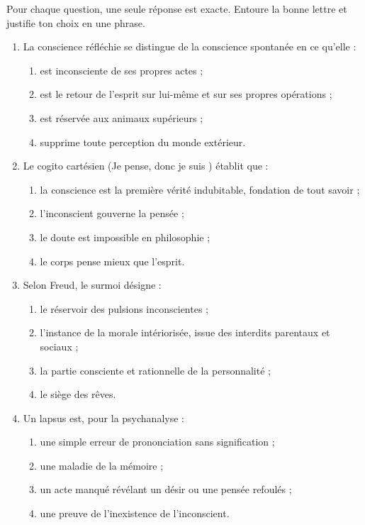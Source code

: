 \documentclass[11pt]{article}
\newcommand{\cle}[1]{{\popxbold\color{popdark}#1}}
\begin{document}
\begin{exercice}
Pour chaque question, une seule réponse est exacte. Entoure la bonne lettre et justifie ton choix en une phrase.

\begin{enumerate}
\item La conscience \cle{réfléchie} se distingue de la conscience spontanée en ce qu'elle :
\begin{enumerate}
\item[a)] est inconsciente de ses propres actes ;
\item[b)] est le retour de l'esprit sur lui-même et sur ses propres opérations ;
\item[c)] est réservée aux animaux supérieurs ;
\item[d)] supprime toute perception du monde extérieur.
\end{enumerate}
\item Le \cle{cogito} cartésien (\guillemotleft Je pense, donc je suis \guillemotright) établit que :
\begin{enumerate}
\item[a)] la conscience est la première vérité indubitable, fondation de tout savoir ;
\item[b)] l'inconscient gouverne la pensée ;
\item[c)] le doute est impossible en philosophie ;
\item[d)] le corps pense mieux que l'esprit.
\end{enumerate}
\item Selon Freud, le \cle{surmoi} désigne :
\begin{enumerate}
\item[a)] le réservoir des pulsions inconscientes ;
\item[b)] l'instance de la morale intériorisée, issue des interdits parentaux et sociaux ;
\item[c)] la partie consciente et rationnelle de la personnalité ;
\item[d)] le siège des rêves.
\end{enumerate}
\item Un \cle{lapsus} est, pour la psychanalyse :
\begin{enumerate}
\item[a)] une simple erreur de prononciation sans signification ;
\item[b)] une maladie de la mémoire ;
\item[c)] un acte manqué révélant un désir ou une pensée refoulés ;
\item[d)] une preuve de l'inexistence de l'inconscient.
\end{enumerate}
\end{enumerate}
\end{exercice}
\end{document}
